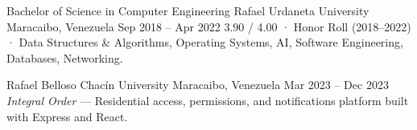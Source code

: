

\EducationEntry%
    {Bachelor of Science in Computer Engineering}%
    {Rafael Urdaneta University}%
    {Maracaibo, Venezuela}%
    {Sep 2018 – Apr 2022}%
    { 3.90 / 4.00 ·  Honor Roll (2018–2022) ·  Data Structures \& Algorithms, Operating Systems, AI, Software Engineering, Databases, Networking.}

%
    {Rafael Belloso Chacín University}%
    {Maracaibo, Venezuela}%
    {Mar 2023 – Dec 2023}%
    { \textit{Integral Order} — Residential access, permissions, and notifications platform built with Express and React.}

\CertificationDivider
{}
